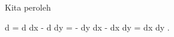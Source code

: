 Kita peroleh

\mavergleichskettealign
{\vergleichskettealign
{d \omega
}
{ =} { d {  } \wedge dx - d {  } \wedge dy
}
{ =} { - {  } dy  \wedge dx  -   {  }  dx \wedge dy
}
{ =} { {  }  dx \wedge dy
}
{ } {
}
}
{}
{}{.}
